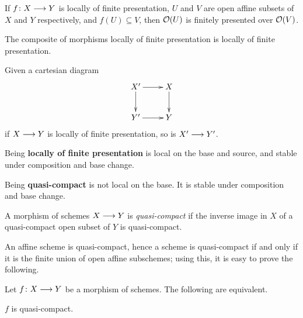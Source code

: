 \begin{1   PRELIMINARY NOTIONS}
\begin{1.1 Algebraic geometry}
\begin{proposition}\hfil
\begin{enumeratei}

\item If $f \colon X \arr Y$ is locally of finite presentation, $U$ and $V$ are open affine subsets of $X$ and $Y$ respectively, and $f(U) \subseteq V$, then $\mathcal{O}(U)$ is finitely presented over $\mathcal{O}(V)$.

\item The composite of morphisms locally of finite presentation is locally of finite presentation.

\item Given a cartesian diagram
   \[
   \xymatrix{
   X'\ar[r]\ar[d] & X\ar[d] \\
   Y' \ar[r] & Y
   }
   \]
if $X \arr Y$ is locally of finite presentation, so is $X' \arr Y'$.
\end{enumeratei}
\end{proposition}
\begin{shaded}
Being \textbf{locally of finite presentation} is local on the base and source, and stable under composition and base change.

Being \textbf{quasi-compact} is not local on the base. It is stable under composition and base change.
\end{shaded}


\begin{definition}
A morphism of schemes $X \arr Y$ is \emph{quasi-compact}%
%
 if the inverse image in $X$ of a quasi-compact open subset of $Y$ is quasi-compact.

An affine scheme is quasi-compact, hence a scheme is quasi-compact if and only if it is the finite union of open affine subschemes; using this, it is easy to prove the following.

\end{definition}

\begin{proposition}\hfil

Let $f \colon X \arr Y$ be a morphism of schemes. The following are equivalent.

\begin{enumeratei}

\item $f$ is quasi-compact.


\end{enumeratei}
\end{proposition}
\end{1.1 Algebraic geometry}
\end{1   PRELIMINARY NOTIONS}

